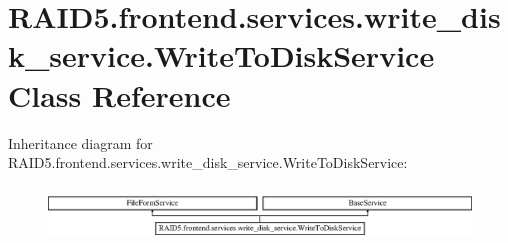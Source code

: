 \hypertarget{class_r_a_i_d5_1_1frontend_1_1services_1_1write__disk__service_1_1_write_to_disk_service}{}\section{R\+A\+I\+D5.\+frontend.\+services.\+write\+\_\+disk\+\_\+service.\+Write\+To\+Disk\+Service Class Reference}
\label{class_r_a_i_d5_1_1frontend_1_1services_1_1write__disk__service_1_1_write_to_disk_service}
Inheritance diagram for R\+A\+I\+D5.\+frontend.\+services.\+write\+\_\+disk\+\_\+service.\+Write\+To\+Disk\+Service\+:\begin{figure}[H]
\begin{center}
\leavevmode
\includegraphics[height=1.462141cm]{class_r_a_i_d5_1_1frontend_1_1services_1_1write__disk__service_1_1_write_to_disk_service}
\end{center}
\end{figure}
